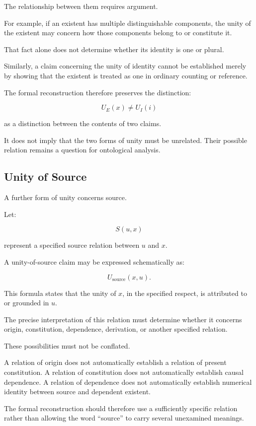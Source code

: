 The relationship between them requires
argument.

For example, if an existent has multiple
distinguishable components, the unity of the
existent may concern how those components
belong to or constitute it.

That fact alone does not determine whether
its identity is one or plural.

Similarly, a claim concerning the unity of
identity cannot be established merely by
showing that the existent is treated as one
in ordinary counting or reference.

The formal reconstruction therefore preserves
the distinction:

\[
    U_E(x)
    \neq
    U_I(i)
\]

as a distinction between the contents of
two claims.

It does not imply that the two forms of unity
must be unrelated. Their possible relation
remains a question for ontological analysis.

\subsection{Unity of Source}

A further form of unity concerns source.

Let:

\[
    S(u,x)
\]

represent a specified source relation between
\(u\) and \(x\).

A unity-of-source claim may be expressed
schematically as:

\[
    U_{\mathrm{source}}(x,u).
\]

This formula states that the unity of \(x\),
in the specified respect, is attributed to
or grounded in \(u\).

The precise interpretation of this relation
must determine whether it concerns origin,
constitution, dependence, derivation, or
another specified relation.

These possibilities must not be conflated.

A relation of origin does not automatically
establish a relation of present constitution.
A relation of constitution does not automatically
establish causal dependence.
A relation of dependence does not automatically
establish numerical identity between source
and dependent existent.

The formal reconstruction should therefore
use a sufficiently specific relation rather
than allowing the word ``source'' to carry
several unexamined meanings.

